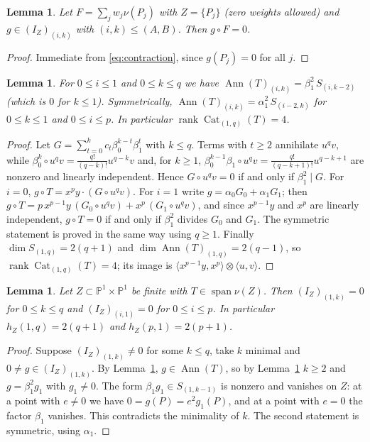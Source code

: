 \documentclass[11pt]{amsart}
\newtheorem{lemma}[theorem]{Lemma}
\theoremstyle{remark}
\newcommand{\PP}{\mathbb{P}}
\DeclareMathOperator{\Ann}{Ann}
\DeclareMathOperator{\Cat}{Cat}
\DeclareMathOperator{\rank}{rank}
\begin{document}
\begin{lemma}\label{lem:vanish}
Let $F=\sum_j w_j\nu(P_j)$ with $Z=\{P_j\}$ \textup(zero weights allowed\textup) and $g\in(I_Z)_{(i,k)}$ with $(i,k)\le(A,B)$. Then $g\circ F=0$.
\end{lemma}
\begin{proof}
Immediate from \eqref{eq:contraction}, since $g(P_j)=0$ for all $j$.
\end{proof}

\begin{lemma}\label{lem:ann}
For $0\le i\le 1$ and $0\le k\le q$ we have $\Ann(T)_{(i,k)}=\beta_1^2\,S_{(i,k-2)}$ \textup(which is $0$ for $k\le1$\textup). Symmetrically, $\Ann(T)_{(i,k)}=\alpha_1^2\,S_{(i-2,k)}$ for $0\le k\le1$ and $0\le i\le p$. In particular $\rank\Cat_{(1,q)}(T)=4$.
\end{lemma}
\begin{proof}
Let $G=\sum_{t=0}^k c_t\beta_0^{k-t}\beta_1^t$ with $k\le q$. Terms with $t\ge2$ annihilate $u^qv$, while $\beta_0^k\circ u^qv=\frac{q!}{(q-k)!}u^{q-k}v$ and, for $k\ge1$, $\beta_0^{k-1}\beta_1\circ u^qv=\frac{q!}{(q-k+1)!}u^{q-k+1}$ are nonzero and linearly independent. Hence $G\circ u^qv=0$ if and only if $\beta_1^2\mid G$. For $i=0$, $g\circ T=x^py\cdot(G\circ u^qv)$. For $i=1$ write $g=\alpha_0G_0+\alpha_1G_1$; then $g\circ T=p\,x^{p-1}y\,(G_0\circ u^qv)+x^p\,(G_1\circ u^qv)$, and since $x^{p-1}y$ and $x^p$ are linearly independent, $g\circ T=0$ if and only if $\beta_1^2$ divides $G_0$ and $G_1$. The symmetric statement is proved in the same way using $q\ge1$. Finally $\dim S_{(1,q)}=2(q+1)$ and $\dim\Ann(T)_{(1,q)}=2(q-1)$, so $\rank\Cat_{(1,q)}(T)=4$; its image is $\langle x^{p-1}y,x^p\rangle\otimes\langle u,v\rangle$.
\end{proof}

\begin{lemma}\label{lem:nocurve}
Let $Z\subset\PP^1\times\PP^1$ be finite with $T\in\operatorname{span}\nu(Z)$. Then $(I_Z)_{(1,k)}=0$ for $0\le k\le q$ and $(I_Z)_{(i,1)}=0$ for $0\le i\le p$. In particular $h_Z(1,q)=2(q+1)$ and $h_Z(p,1)=2(p+1)$.
\end{lemma}
\begin{proof}
Suppose $(I_Z)_{(1,k)}\neq0$ for some $k\le q$, take $k$ minimal and $0\ne g\in(I_Z)_{(1,k)}$. By Lemma~\ref{lem:vanish}, $g\in\Ann(T)$, so by Lemma~\ref{lem:ann} $k\ge2$ and $g=\beta_1^2g_1$ with $g_1\ne0$. The form $\beta_1g_1\in S_{(1,k-1)}$ is nonzero and vanishes on $Z$: at a point with $e\ne0$ we have $0=g(P)=e^2g_1(P)$, and at a point with $e=0$ the factor $\beta_1$ vanishes. This contradicts the minimality of $k$. The second statement is symmetric, using $\alpha_1$.
\end{proof}
\end{document}
